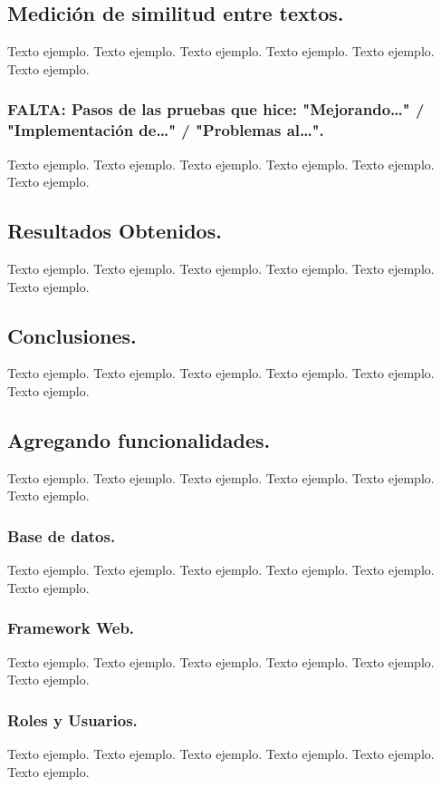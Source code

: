 \documentclass[12pt,a4paper]{article}
\begin{document}
\subsection{Medición de similitud entre textos.}
Texto ejemplo. Texto ejemplo. Texto ejemplo. Texto ejemplo. Texto ejemplo. Texto ejemplo.

\subsubsection{FALTA: Pasos de las pruebas que hice: "Mejorando…" / "Implementación de…" / "Problemas al…".}
Texto ejemplo. Texto ejemplo. Texto ejemplo. Texto ejemplo. Texto ejemplo. Texto ejemplo.

\subsection{Resultados Obtenidos.}
Texto ejemplo. Texto ejemplo. Texto ejemplo. Texto ejemplo. Texto ejemplo. Texto ejemplo.

\subsection{Conclusiones.}
Texto ejemplo. Texto ejemplo. Texto ejemplo. Texto ejemplo. Texto ejemplo. Texto ejemplo.

\subsection{Agregando funcionalidades.}
Texto ejemplo. Texto ejemplo. Texto ejemplo. Texto ejemplo. Texto ejemplo. Texto ejemplo.

\subsubsection{Base de datos.}
Texto ejemplo. Texto ejemplo. Texto ejemplo. Texto ejemplo. Texto ejemplo. Texto ejemplo.

\subsubsection{Framework Web.}
Texto ejemplo. Texto ejemplo. Texto ejemplo. Texto ejemplo. Texto ejemplo. Texto ejemplo.

\subsubsection{Roles y Usuarios.}
Texto ejemplo. Texto ejemplo. Texto ejemplo. Texto ejemplo. Texto ejemplo. Texto ejemplo.
\end{document}
